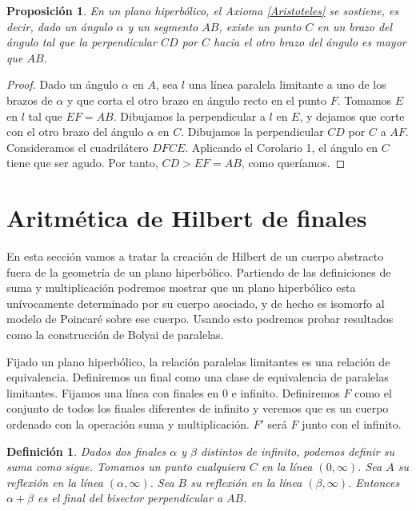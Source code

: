 \documentclass[a4paper]{amsart}
\theoremstyle{plain}
\newtheorem{definition}{Definición}
\newtheorem{proposition}{Proposición}
\begin{document}
\begin{proposition}
En un plano hiperbólico, el Axioma \ref{Aristoteles} se sostiene, es decir, dado un ángulo $\alpha$ y un segmento $AB$, existe un punto $C$ en un brazo del ángulo tal que la perpendicular $CD$ por $C$ hacia el otro brazo del ángulo es mayor que $AB$.
\end{proposition}

\begin{proof}
Dado un ángulo $\alpha$ en $A$, sea $l$ una línea paralela limitante a uno de los brazos de $\alpha$ y que corta el otro brazo en ángulo recto en el punto $F$. Tomamos $E$ en $l$ tal que $EF=AB$. Dibujamos la perpendicular a $l$ en $E$, y dejamos que corte con el otro brazo del ángulo $\alpha$ en $C$. Dibujamos la perpendicular $CD$ por $C$ a $AF$. Consideramos el cuadrilátero $DFCE$. Aplicando el Corolario 1, el ángulo en $C$ tiene que ser agudo. Por tanto, $CD>EF=AB$, como queríamos.
\end{proof}

\section{Aritmética de Hilbert de finales}

En esta sección vamos a tratar la creación de Hilbert de un cuerpo abstracto fuera de la geometría de un plano hiperbólico. Partiendo de las definiciones de suma y multiplicación podremos mostrar que un plano hiperbólico esta unívocamente determinado por su cuerpo asociado, y de hecho es isomorfo al modelo de Poincaré sobre ese cuerpo. Usando esto podremos probar resultados como la construcción de Bolyai de paralelas.

Fijado un plano hiperbólico, la relación paralelas limitantes es una relación de equivalencia. Definiremos un final como una clase de equivalencia de paralelas limitantes. Fijamos una línea con finales en 0 e infinito. Definiremos $F$ como el conjunto de todos los finales diferentes de infinito y veremos que es un cuerpo ordenado con la operación suma y multiplicación. $F'$ será $F$ junto con el infinito.

\begin{definition}
Dados dos finales $\alpha$ y $\beta$ distintos de infinito, podemos definir su suma como sigue. Tomamos un punto cualquiera $C$ en la línea $(0,\infty)$. Sea $A$ su reflexión en la línea $(\alpha,\infty)$. Sea $B$ su reflexión en la línea $(\beta,\infty)$. Entonces $\alpha + \beta$ es el final del bisector perpendicular a $AB$.
\end{definition}
\end{document}
